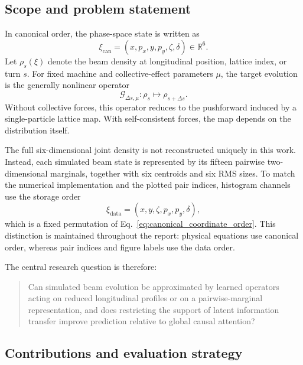 \subsection{Scope and problem statement}

In canonical order, the phase-space state is written as
\begin{equation}
    \xi_{\mathrm{can}}
    =
    (x,p_x,y,p_y,\zeta,\delta)
    \in
    \mathbb{R}^{6}.
    \label{eq:canonical_coordinate_order}
\end{equation}
Let $\rho_s(\xi)$ denote the beam density at longitudinal position, lattice index, or turn $s$. For fixed machine and collective-effect parameters $\mu$, the target evolution is the generally nonlinear operator
\begin{equation}
    \mathcal{G}_{\Delta s,\mu}:
    \rho_s
    \longmapsto
    \rho_{s+\Delta s}.
    \label{eq:intro_operator_target}
\end{equation}
Without collective forces, this operator reduces to the pushforward induced by a single-particle lattice map. With self-consistent forces, the map depends on the distribution itself.

The full six-dimensional joint density is not reconstructed uniquely in this work. Instead, each simulated beam state is represented by its fifteen pairwise two-dimensional marginals, together with six centroids and six RMS sizes. To match the numerical implementation and the plotted pair indices, histogram channels use the storage order
\begin{equation}
    \xi_{\mathrm{data}}
    =
    (x,y,\zeta,p_x,p_y,\delta),
    \label{eq:data_coordinate_order}
\end{equation}
which is a fixed permutation of Eq.~\eqref{eq:canonical_coordinate_order}. This distinction is maintained throughout the report: physical equations use canonical order, whereas pair indices and figure labels use the data order.

The central research question is therefore:
\begin{quote}
Can simulated beam evolution be approximated by learned operators acting on reduced longitudinal profiles or on a pairwise-marginal representation, and does restricting the support of latent information transfer improve prediction relative to global causal attention?
\end{quote}

\subsection{Contributions and evaluation strategy}

